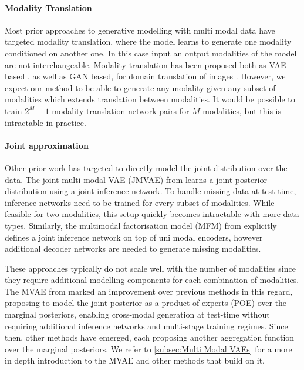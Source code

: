 \paragraph{Modality Translation}
Most prior approaches to generative modelling with multi modal data have targeted modality translation, where the model learns to generate one modality conditioned on another one.
In this case input an output modalities of the model are not interchangeable.
Modality translation has been proposed both as VAE based \citep{pu2016variational, pandey2017variational}, as well as GAN based, for domain translation of images \citep{ledig2017photo, liu2019few}.
However, we expect our method to be able to generate any modality given any subset of modalities which extends translation between modalities.
It would be possible to train $2^M -1$ modality translation network pairs for $M$ modalities, but this is intractable in practice.

\paragraph{Joint approximation}
Other prior work has targeted to directly model the joint distribution over the data.
The joint multi modal VAE (JMVAE) from \citep{suzuki2016joint} learns a joint posterior distribution using a joint inference network.
To handle missing data at test time, inference networks need to be trained for every subset of modalities.
While feasible for two modalities, this setup quickly becomes intractable with more data types.
Similarly, the multimodal factorisation model (MFM) from \citep{tsai2018learning} explicitly defines a joint inference network on top of uni modal encoders, however additional decoder networks are needed to generate missing modalities.

These approaches typically do not scale well with the number of modalities since they require additional modelling components for each combination of modalities.
The MVAE from \citep{poe} marked an improvement over previous methods in this regard, proposing to model the joint posterior as a product of experts (POE) over the marginal posteriors, enabling cross-modal generation at test-time without requiring additional inference networks and multi-stage training regimes.
Since then, other methods have emerged, each proposing another aggregation function over the marginal posteriors.
We refer to \cref{subsec:Multi Modal VAEs} for a more in depth introduction to the MVAE and other methods that build on it.

